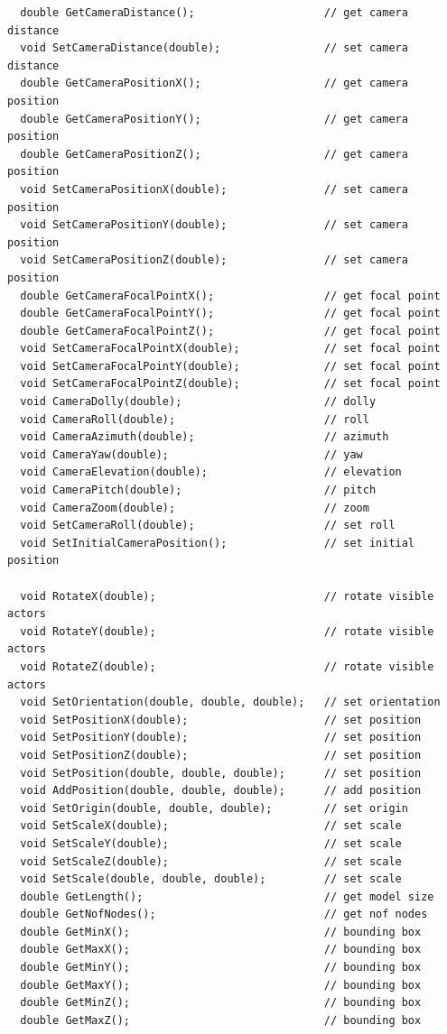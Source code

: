 \documentclass[a4paper,12pt]{article}
\begin{document}
\begin{footnotesize}
\begin{verbatim}
  double GetCameraDistance();                    // get camera distance
  void SetCameraDistance(double);                // set camera distance
  double GetCameraPositionX();                   // get camera position
  double GetCameraPositionY();                   // get camera position
  double GetCameraPositionZ();                   // get camera position
  void SetCameraPositionX(double);               // set camera position
  void SetCameraPositionY(double);               // set camera position
  void SetCameraPositionZ(double);               // set camera position
  double GetCameraFocalPointX();                 // get focal point
  double GetCameraFocalPointY();                 // get focal point
  double GetCameraFocalPointZ();                 // get focal point
  void SetCameraFocalPointX(double);             // set focal point
  void SetCameraFocalPointY(double);             // set focal point
  void SetCameraFocalPointZ(double);             // set focal point
  void CameraDolly(double);                      // dolly
  void CameraRoll(double);                       // roll
  void CameraAzimuth(double);                    // azimuth
  void CameraYaw(double);                        // yaw
  void CameraElevation(double);                  // elevation
  void CameraPitch(double);                      // pitch
  void CameraZoom(double);                       // zoom
  void SetCameraRoll(double);                    // set roll
  void SetInitialCameraPosition();               // set initial position

  void RotateX(double);                          // rotate visible actors
  void RotateY(double);                          // rotate visible actors
  void RotateZ(double);                          // rotate visible actors
  void SetOrientation(double, double, double);   // set orientation
  void SetPositionX(double);                     // set position
  void SetPositionY(double);                     // set position
  void SetPositionZ(double);                     // set position
  void SetPosition(double, double, double);      // set position
  void AddPosition(double, double, double);      // add position
  void SetOrigin(double, double, double);        // set origin
  void SetScaleX(double);                        // set scale
  void SetScaleY(double);                        // set scale
  void SetScaleZ(double);                        // set scale
  void SetScale(double, double, double);         // set scale
  double GetLength();                            // get model size
  double GetNofNodes();                          // get nof nodes
  double GetMinX();                              // bounding box
  double GetMaxX();                              // bounding box
  double GetMinY();                              // bounding box
  double GetMaxY();                              // bounding box
  double GetMinZ();                              // bounding box
  double GetMaxZ();                              // bounding box


\end{verbatim}
\end{footnotesize}
\end{document}
